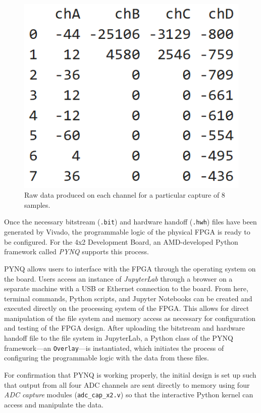 \documentclass[reprint,amsmath,amssymb]{revtex4-2}
\begin{document}
\begin{figure}
    \centering
    \includegraphics[width=0.8\linewidth]{figs/ADC_table.png}
    \caption{Raw data produced on each channel for a particular capture of 8 samples.}
    \label{fig:17}
\end{figure}

Once the necessary bitstream (\verb|.bit|) and hardware handoff (\verb|.hwh|) files have been generated by Vivado, the programmable logic of the physical FPGA is ready to be configured. For the 4x2 Development Board, an AMD-developed Python framework called \textit{PYNQ} supports this process.

PYNQ allows users to interface with the FPGA through the operating system on the board. Users access an instance of \textit{JupyterLab} through a browser on a separate machine with a USB or Ethernet connection to the board. From here, terminal commands, Python scripts, and Jupyter Notebooks can be created and executed directly on the processing system of the FPGA. This allows for direct manipulation of the file system and memory access as necessary for configuration and testing of the FPGA design. After uploading the bitstream and hardware handoff file to the file system in JupyterLab, a Python class of the PYNQ framework---an \verb|Overlay|---is instantiated, which initiates the process of configuring the programmable logic with the data from these files.

For confirmation that PYNQ is working properly, the initial design is set up such that output from all four ADC channels are sent directly to memory using four \textit{ADC capture} modules (\verb|adc_cap_x2.v|) so that the interactive Python kernel can access and manipulate the data. 
\end{document}
